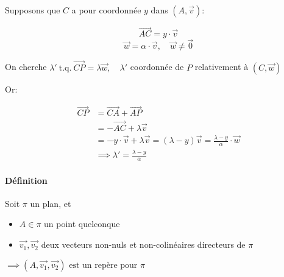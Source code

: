 \documentclass[
    11pt,
    a4paper,
    oneside,
    headinlcude, footinclude,
    twoside,
]{report}
\renewcommand{\vec}[1]{\overrightarrow{#1}}
\newcommand{\tq}[0]{ \ \textrm{t.q.}\ }
\begin{document}
Supposons que $C$ a pour coordonnée $y$ dans $(A, \vec v)$:

$$\vec{AC} = y \cdot \vec v$$
$$\vec w = \alpha \cdot \vec v, \quad \vec w \ne \vec 0$$

On cherche $\lambda' \tq \vec{CP} = \lambda \vec w, \quad \lambda'$
coordonnée de $P$ relativement à $(C, \vec w)$

Or:

\[
    \begin{split}
        \vec{CP} &= \vec{CA} + \vec{AP}\\
        & = -\vec{AC} + \lambda \vec v\\
        & = -y \cdot \vec v  + \lambda \vec v = (\lambda - y) \vec v =
        \frac{\lambda - y}{\alpha} \cdot \vec w\\
        & \implies \lambda' = \frac{\lambda - y}{\alpha}
    \end{split}
\]

\paragraph{Définition}

Soit $\pi$ un plan, et

\begin{itemize}
    \item $A \in \pi$ un point quelconque
    \item $\vec{v_{1}}, \vec{v_{2}}$ deux vecteurs non-nuls et non-colinéaires
        directeurs de $\pi$
\end{itemize}

$\implies (A, \vec{v_{1}}, \vec{v_{2}}) \text{ est un repère pour }\pi$
\end{document}
